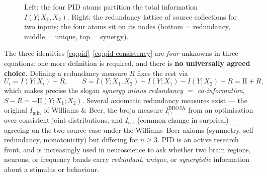 \documentclass[11pt]{article}
\begin{document}
\begin{figure}[h]
\centering
{}
\caption{Left: the four PID atoms partition the total information $I(Y;X_1,X_2)$. Right: the
redundancy lattice of source collections for two inputs; the four atoms sit on its nodes
(bottom = redundancy, middle = unique, top = synergy).}
\end{figure}

The three identities \eqref{eq:pid}--\eqref{eq:pid-consistency} are \emph{four} unknowns in three
equations: one more definition is required, and there is \textbf{no universally agreed choice}.
Defining a redundancy measure $R$ fixes the rest via
\begin{equation}
  U_i=I(Y;X_i)-R,\qquad S=I(Y;X_1,X_2)-I(Y;X_1)-I(Y;X_2)+R = \mathrm{II}+R ,
\end{equation}
which makes precise the slogan \emph{synergy minus redundancy $=$ co-information},
$S-R=-\mathrm{II}(Y;X_1;X_2)$. Several axiomatic redundancy measures exist --- the original
$I_{\min}$ of Williams \& Beer, the broja measure $I_{\cap}^{\mathrm{BROJA}}$ from an optimisation
over consistent joint distributions, and $I_{\mathrm{ccs}}$ (common change in surprisal) ---
agreeing on the two-source case under the Williams--Beer axioms (symmetry, self-redundancy,
monotonicity) but differing for $n\ge3$. PID is an active research front, and is increasingly used
in neuroscience to ask whether two brain regions, neurons, or frequency bands carry
\emph{redundant}, \emph{unique}, or \emph{synergistic} information about a stimulus or behaviour.
\end{document}
